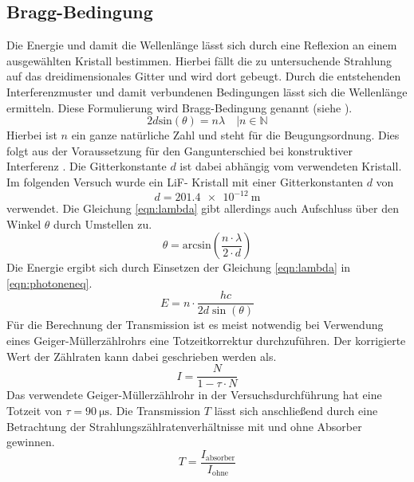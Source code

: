 \subsection{Bragg-Bedingung}
Die Energie und damit die Wellenlänge lässt sich durch eine Reflexion an einem ausgewählten Kristall bestimmen. Hierbei fällt die 
zu untersuchende Strahlung auf das dreidimensionales Gitter und wird dort gebeugt. Durch die entstehenden Interferenzmuster und damit verbundenen Bedingungen lässt sich
die Wellenlänge ermitteln. Diese Formulierung wird Bragg-Bedingung genannt (siehe \cite{skript4}).
\begin{equation}
\label{eqn:lambda}
2 d \text{sin}(\theta) =  n \lambda \quad | n \in \mathbb{N}
\end{equation}
Hierbei ist $n$ ein ganze natürliche Zahl und steht für die Beugungsordnung. Dies folgt aus der Voraussetzung für den Gangunterschied bei konstruktiver Interferenz
. Die Gitterkonstante $d$ ist dabei abhängig vom verwendeten Kristall.
Im folgenden Versuch wurde ein LiF- Kristall mit einer Gitterkonstanten $d$ von
\begin{equation}
d = \SI{201.4e-12}{\meter}
\end{equation}
verwendet.
Die Gleichung \eqref{eqn:lambda} gibt allerdings auch Aufschluss über den Winkel $\theta$ durch Umstellen zu.
\begin{equation}
\label{eqn:winkelmitlambda}
\theta = \text{arcsin}\left(\frac{n \cdot \lambda}{2 \cdot d}\right)
\end{equation}
Die Energie ergibt sich durch Einsetzen der Gleichung \eqref{eqn:lambda} in \eqref{eqn:photoneneq}.
\begin{equation}
    \label{eqn:braggEnergy}
    E = n \cdot \frac{h c}{2 d \sin (\theta)}
\end{equation}
Für die Berechnung der Transmission ist es meist notwendig bei Verwendung eines Geiger-Müllerzählrohrs eine Totzeitkorrektur durchzuführen.
Der korrigierte Wert der Zählraten kann dabei geschrieben werden als.
\begin{equation}
\label{eqn:totzeit}
I = \frac{N}{1 - \tau \cdot N}
\end{equation}
Das verwendete Geiger-Müllerzählrohr in der Versuchsdurchführung hat eine Totzeit von $\tau = \SI{90}{\micro\second}$.
Die Transmission $T$ lässt sich anschließend durch eine Betrachtung der Strahlungszählratenverhältnisse mit und ohne Absorber gewinnen.
\begin{equation}
\label{eqn:wichtig}
T = \frac{I_{\text{absorber}}}{I_{\text{ohne}}}
\end{equation}

